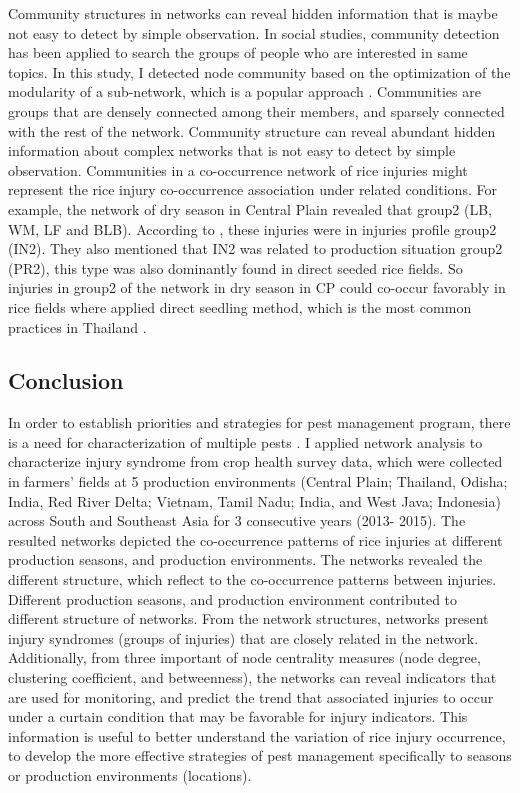 Community structures in networks can reveal hidden information that is maybe not easy to detect by simple observation. In social studies, community detection has been applied to search the groups of people who are interested in same topics.   In this study, I detected node community based on the optimization of the modularity of a sub-network, which is a popular approach \cite{Liu_2014_Detecting}. Communities are groups that are densely connected among their members, and sparsely connected with the rest of the network. Community structure can reveal abundant hidden information about complex networks that is not easy to detect by simple observation. Communities in a co-occurrence network of rice injuries might represent the rice injury co-occurrence association under related conditions. For example, the network of dry season in Central Plain revealed that group2 (LB, WM, LF and BLB).  According to \citet{Savary_2000_Characterization}, these injuries were in injuries profile group2 (IN2). They also mentioned that IN2 was related to production situation group2 (PR2), this type was also dominantly found in direct seeded rice fields. So injuries in group2 of the network in dry season in CP could co-occur favorably in rice fields where applied direct seedling method, which is the most common practices in Thailand \citep{IRRI_2013_Rice}. 


\subsection{Conclusion}

In order to establish priorities and strategies for pest management program, there is a need for characterization of multiple pests \citep{Mew_2004_Looking}. I applied network analysis to characterize injury syndrome from crop health survey data, which were collected in farmers’ fields at 5 production environments (Central Plain; Thailand, Odisha; India, Red River Delta; Vietnam, Tamil Nadu; India, and West Java; Indonesia) across South and Southeast Asia for 3 consecutive years (2013- 2015). The resulted networks depicted the co-occurrence patterns of rice injuries at different production seasons, and production environments. The networks revealed the different structure, which reflect to the co-occurrence patterns between injuries. Different production seasons, and production environment contributed to different structure of networks. From the network structures, networks present injury syndromes (groups of injuries) that are closely related in the network. Additionally, from three important of node centrality measures (node degree, clustering coefficient, and betweenness), the networks can reveal indicators that are used for monitoring, and predict the trend that associated injuries to occur under a curtain condition that may be favorable for injury indicators. This information is useful to better understand the variation of rice injury occurrence, to develop the more effective strategies of pest management specifically to seasons or production environments (locations).

